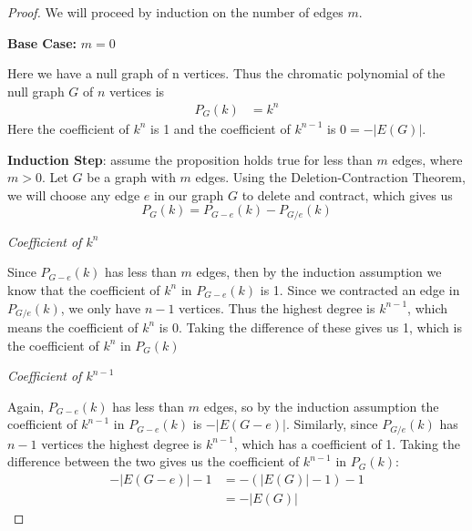 \documentclass[11pt, oneside]{article}   	%
\begin{document}
\begin{proof}

We will proceed by induction on the number of edges $m$.

\textbf{Base Case:} $m=0$

Here we have a null graph of n vertices. Thus the chromatic polynomial of the null graph $G$ of $n$ vertices is
	\begin{align*}
		P_G(k) & = k^n
	\end{align*}
Here the coefficient of $k^n$ is 1 and the coefficient of $k^{n-1}$ is $0 = - |E(G)|$.

\textbf{Induction Step}: assume the proposition holds true for less than $m$ edges, where $m>0$. Let $G$ be a graph with $m$ edges. Using the Deletion-Contraction Theorem, we will choose any edge $e$ in our graph $G$ to delete and contract, which gives us
$$P_G(k) = P_{G-e}(k) - P_{G/e}(k)$$

\emph{Coefficient of $k^n$}

Since $P_{G-e}(k)$ has less than $m$ edges, then by the induction assumption we know that the coefficient of $k^n$ in $P_{G-e}(k)$ is 1. Since we contracted an edge in $P_{G/e}(k)$, we only have $n-1$ vertices. Thus the highest degree is $k^{n-1}$, which means the coefficient of $k^n$ is 0. Taking the difference of these gives us 1, which is the coefficient of $k^n$ in $P_G(k)$

\emph{Coefficient of $k^{n-1}$}

Again, $P_{G-e}(k)$ has less than $m$ edges, so by the induction assumption the coefficient of $k^{n-1}$ in $P_{G-e}(k)$ is $- |E(G-e)|$. Similarly, since $P_{G/e}(k)$ has $n-1$ vertices the highest degree is $k^{n-1}$, which has a coefficient of 1. Taking the difference between the two gives us the coefficient of $k^{n-1}$ in $P_G(k)$:
	\begin{align*}
		- |E(G-e)| - 1 & = -(|E(G)| - 1) -1 \\
		& =  -|E(G)|
	\end{align*}

\end{proof}




%
\end{document}

